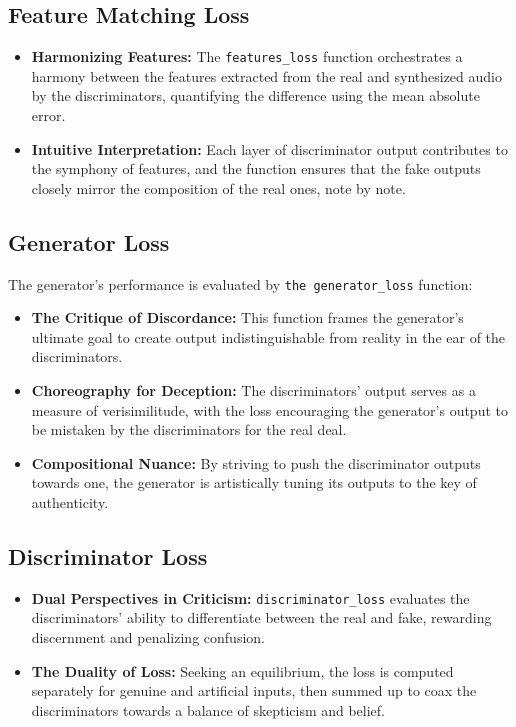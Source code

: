 \documentclass[a4paper]{article}
\begin{document}
\subsection{Feature Matching Loss}

\begin{itemize}
  \item \textbf{Harmonizing Features:} The \verb|features_loss| function orchestrates a harmony between the features extracted from the real and synthesized audio by the discriminators, quantifying the difference using the mean absolute error. 

  \item \textbf{Intuitive Interpretation:} Each layer of discriminator output contributes to the symphony of features, and the function ensures that the fake outputs closely mirror the composition of the real ones, note by note.
\end{itemize}

\subsection{Generator Loss}

The generator's performance is evaluated by \verb|the generator_loss| function:

\begin{itemize}
  \item \textbf{The Critique of Discordance:} This function frames the generator's ultimate goal to create output indistinguishable from reality in the ear of the discriminators.
  
  \item \textbf{Choreography for Deception:} The discriminators' output serves as a measure of verisimilitude, with the loss encouraging the generator's output to be mistaken by the discriminators for the real deal.
  
  \item \textbf{Compositional Nuance:} By striving to push the discriminator outputs towards one, the generator is artistically tuning its outputs to the key of authenticity.
\end{itemize}

\subsection{Discriminator Loss}

\begin{itemize}
  \item \textbf{Dual Perspectives in Criticism:} \verb|discriminator_loss| evaluates the discriminators' ability to differentiate between the real and fake, rewarding discernment and penalizing confusion.
  
  \item \textbf{The Duality of Loss:} Seeking an equilibrium, the loss is computed separately for genuine and artificial inputs, then summed up to coax the discriminators towards a balance of skepticism and belief.
\end{itemize}
\end{document}

